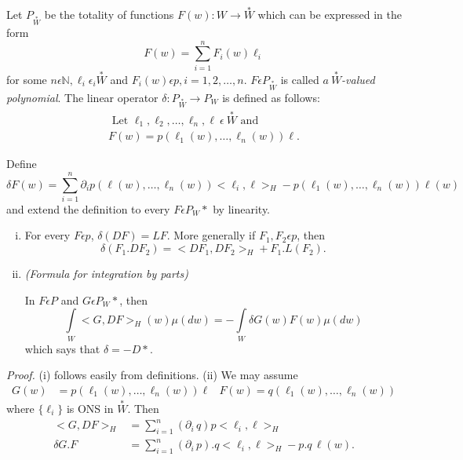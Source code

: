 \begin{definition}%
  Let $P_{\overset{\ast}{W}}$ be the totality of functions $F(w): W
  \to \overset{\ast}{W}$ which 
  can be expressed in the form 
  $$
  F(w) = \sum^{n}_{ i =1} F_i (w) \ell_i
  $$
  for some $n \epsilon  \mathbb{N}, \ell_i \epsilon _i \overset{\ast}{W}$ and $F_i
  (w) \epsilon  p, i = 1,2,\ldots, n$. $F \epsilon  P_{\overset{\ast}{W}}$ is
  called \textit{$a~ \overset{\ast}{W}$-valued polynomial}. The linear operator
  $\delta: P_{\overset{\ast}{W}} \to P_W$ is defined as follows: 
  \begin{gather*}
    \text{ Let } \ell_1, \ell_2, \ldots, \ell_n, \ell ~\epsilon ~ \overset{\ast}{W}
    \text { and }\\ 
    F(w) = p (\ell_1 (w), \ldots, \ell_n (w))\ell.
  \end{gather*}
\end{definition}

Define\pageoriginale
$$
\delta F (w) = \sum_{i=1}^{n} \partial_i p(\ell (w), \ldots, \ell_n
(w)) < \ell_i, \ell > _H 
-p (\ell_1 (w), \ldots, \ell_n (w))\ell (w)
$$
and extend the definition to every $F \epsilon  P_{W}*$ by linearity.

\setcounter{proposition}{4}
\begin{proposition}%
  \begin{enumerate}[(i)]
  \item For every $F \epsilon  p$, $\delta (DF) = LF$. More
    generally if $F_1, F_2 \epsilon  p$, then 
    \begin{equation*}
      \delta (F_1 . DF_2) = < DF_1, DF_2 >_H + F_1 . L
      (F_2).\tag{1.4}\label{eq1.4} 
    \end{equation*}
  \item {\em (Formula for integration by parts)}

    In $F \epsilon  P$ and $G \epsilon  P_{W}*$, then
    \begin{equation*}
      \int\limits_{W} < G, DF >_{H} (w) \mu (dw) = -\int\limits_{W} \delta
      G (w) F (w) \mu (dw) \tag{1.5}\label{eq1.5}  
    \end{equation*}
    which says that $\delta = - D*$.
  \end{enumerate}
\end{proposition}

\noindent
\textit{Proof.}
  (i) follows easily from definitions. (ii) We may assume
  \begin{align*}
    G(w) & = p (\ell _1 (w), \ldots, \ell_n (w))\ell
    & F(w)  = q (\ell _1 (w), \ldots, \ell_n (w))
  \end{align*}
  where $\{ \ell_i\}$ is ONS in $\overset{\ast}{W}$. Then
  \begin{align*}
    < G, DF >_H &= \sum_{i=1}^{n} (\partial_i\, q)p < \ell_i, \ell >_H\\
    \delta G.F &= \sum_{i=1}^{n} (\partial_i\, p).q < \ell_i, \ell > _H
    - p.q \, \ell(w). \tag*{$\Box$} 
  \end{align*}


